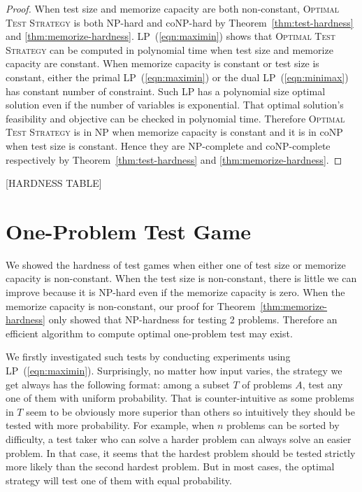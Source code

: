 \documentclass{article}
\begin{document}
\begin{proof}
When test size and memorize capacity are both non-constant, \textsc{Optimal
Test Strategy} is both NP-hard and coNP-hard by Theorem~\ref{thm:test-hardness}
and \ref{thm:memorize-hardness}.  LP~(\ref{eqn:maximin}) shows that
\textsc{Optimal Test Strategy} can be computed in polynomial time when test
size and memorize capacity are constant.  When memorize capacity is constant or
test size is constant, either the primal LP~(\ref{eqn:maximin}) or the dual
LP~(\ref{eqn:minimax}) has constant number of constraint. Such LP has a
polynomial size optimal solution even if the number of variables is
exponential. That optimal solution's feasibility and objective can be checked
in polynomial time. Therefore \textsc{Optimal Test Strategy} is in NP when
memorize capacity is constant and it is in coNP when test size is constant.
Hence they are NP-complete and coNP-complete respectively by
Theorem~\ref{thm:test-hardness} and \ref{thm:memorize-hardness}. 
\end{proof}

[HARDNESS TABLE]

\section{One-Problem Test Game}

We showed the hardness of test games when either one of test size or memorize
capacity is non-constant. When the test size is non-constant, there is little
we can improve because it is NP-hard even if the memorize capacity is zero.
When the memorize capacity is non-constant, our proof for
Theorem~\ref{thm:memorize-hardness} only showed that NP-hardness for testing 2
problems. Therefore an efficient algorithm to compute optimal one-problem test
may exist. 

We firstly investigated such tests by conducting experiments using
LP~(\ref{eqn:maximin}). Surprisingly, no matter how input varies, the strategy we get
always has the following format: among a subset $T$ of problems $A$, test any
one of them with uniform probability. That is counter-intuitive as some
problems in $T$ seem to be obviously more superior than others so intuitively they should
be tested with more probability. For example, when $n$ problems can be sorted
by difficulty, a test taker who can solve a harder problem can always solve an
easier problem. In that case, it seems that the hardest problem should be
tested strictly more likely than the second hardest problem. But in most cases,
the optimal strategy will test one of them with equal probability.
\end{document}
